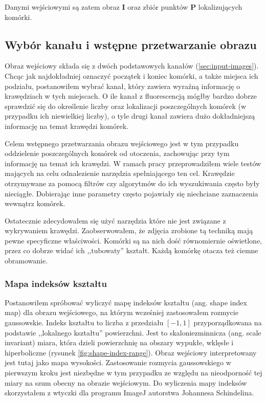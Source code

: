 \documentclass[declaration,shortabstract,mgr]{iithesis}
\newcommand{\image}{\mathbf{I}}
\begin{document}
Danymi wejściowymi są zatem obraz $\image$ oraz zbiór punktów $\mathbf{P}$ lokalizujących komórki.

\subsection{Wybór kanału i wstępne przetwarzanie obrazu}

Obraz wejściowy składa się z dwóch podstawowych kanałów (\ref{sec:input-images}).
Chcąc jak najdokładniej oznaczyć początek i koniec komórki, a także miejsca ich podziału, postanowiłem wybrać kanał, który zawiera wyraźną informację o krawędziach w tych miejscach.
O ile kanał z fluorescencją mógłby bardzo dobrze sprawdzić się do określenie liczby oraz lokalizacji poszczególnych komórek (w przypadku ich niewielkiej liczby), o tyle drugi kanał zawiera dużo dokładniejszą informację na temat krawędzi komórek.

Celem wstępnego przetwarzania obrazu wejściowego jest w tym przypadku oddzielenie poszczególnych komórek od otoczenia, zachowując przy tym informację na temat ich krawędzi. W ramach pracy przeprowadziłem wiele testów mających na celu odnalezienie narzędzia spełniającego ten cel. Krawędzie otrzymywane za pomocą filtrów czy algorytmów do ich wyszukiwania często były nieciągłe. Dobierając inne parametry często pojawiały się niechciane zaznaczenia wewnątrz komórek.

Ostatecznie zdecydowałem się użyć narzędzia które nie jest związane z wykrywaniem krawędzi. Zaobserwowałem, że zdjęcia zrobione tą techniką mają pewne specyficzne właściwości. Komórki są na nich dość równomiernie oświetlone, przez co dobrze widać ich ,,tubowaty'' kształt. Każdą komórkę otacza też ciemne obramowanie.

\subsubsection{Mapa indeksów kształtu}

Postanowiłem spróbować wyliczyć mapę indeksów kształtu (ang. shape index map) dla obrazu wejściowego, na którym wcześniej zastosowałem rozmycie gaussowskie. Indeks kształtu to liczba z przedziału $[-1, 1]$ przyporządkowana na podstawie ,,lokalnego kształtu'' powierzchni. Jest to skaloniezminnicza (ang. scale invariant) miara, która dzieli powierzchnię na obszary wypukłe, wklęsłe i hiperboliczne (rysunek \ref{fig:shape-index-range})\cite{paper:shape-index}. Obraz wejściowy interpretowany jest tutaj jako mapa wysokości. Zastosowanie rozmycia gaussowskiego w pierwszym kroku jest niezbędne w tym przypadku ze względu na nieodporność tej miary na szum obecny na obrazie wejściowym. Do wyliczenia mapy indeksów skorzystałem z wtyczki dla programu ImageJ autorstwa Johannesa Schindelina\cite{plugin:shape-index-map}.
\end{document}
